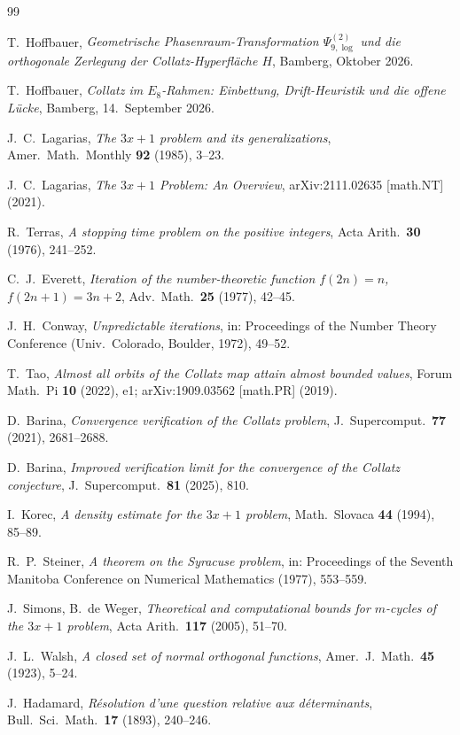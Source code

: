 \documentclass[11pt,a4paper]{article}
\theoremstyle{plain}
\theoremstyle{definition}
\numberwithin{equation}{section}
\begin{document}
\begin{thebibliography}{99}

T.~Hoffbauer,
\emph{Geometrische Phasenraum-Transformation $\Psi_{9,\log}^{(2)}$
und die orthogonale Zerlegung der Collatz-Hyperfläche $H$},
Bamberg, Oktober 2026.

T.~Hoffbauer,
\emph{Collatz im $E_8$-Rahmen: Einbettung, Drift-Heuristik und die offene Lücke},
Bamberg, 14.~September 2026.

J.~C.~Lagarias,
\emph{The $3x+1$ problem and its generalizations},
Amer.\ Math.\ Monthly \textbf{92} (1985), 3--23.

J.~C.~Lagarias,
\emph{The $3x+1$ Problem: An Overview},
arXiv:2111.02635 [math.NT] (2021).

R.~Terras,
\emph{A stopping time problem on the positive integers},
Acta Arith.\ \textbf{30} (1976), 241--252.

C.~J.~Everett,
\emph{Iteration of the number-theoretic function
$f(2n)=n$, $f(2n+1)=3n+2$},
Adv.\ Math.\ \textbf{25} (1977), 42--45.

J.~H.~Conway,
\emph{Unpredictable iterations},
in: Proceedings of the Number Theory Conference
(Univ.\ Colorado, Boulder, 1972), 49--52.

T.~Tao,
\emph{Almost all orbits of the Collatz map attain almost bounded values},
Forum Math.\ Pi \textbf{10} (2022), e1;
arXiv:1909.03562 [math.PR] (2019).

D.~Barina,
\emph{Convergence verification of the Collatz problem},
J.\ Supercomput.\ \textbf{77} (2021), 2681--2688.

D.~Barina,
\emph{Improved verification limit for the convergence of the Collatz conjecture},
J.\ Supercomput.\ \textbf{81} (2025), 810.

I.~Korec,
\emph{A density estimate for the $3x+1$ problem},
Math.\ Slovaca \textbf{44} (1994), 85--89.

R.~P.~Steiner,
\emph{A theorem on the Syracuse problem},
in: Proceedings of the Seventh Manitoba Conference on Numerical Mathematics
(1977), 553--559.

J.~Simons, B.~de Weger,
\emph{Theoretical and computational bounds for $m$-cycles of the $3x+1$ problem},
Acta Arith.\ \textbf{117} (2005), 51--70.

J.~L.~Walsh,
\emph{A closed set of normal orthogonal functions},
Amer.\ J.\ Math.\ \textbf{45} (1923), 5--24.

J.~Hadamard,
\emph{Résolution d'une question relative aux déterminants},
Bull.\ Sci.\ Math.\ \textbf{17} (1893), 240--246.

\end{thebibliography}
\end{document}
